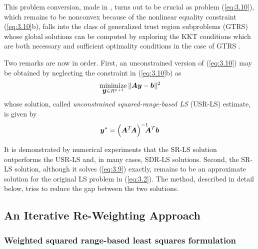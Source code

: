 This problem conversion, made in \cite{BeckStLi}, turns out to be crucial as problem (\ref{eq:3.10}), which remains to be nonconvex because of the nonlinear equality constraint (\ref{eq:3.10}b), falls into the class of generalized trust region subproblems (GTRS) \cite{More, FortinWol}  whose global solutions can be computed by exploring the KKT conditions which are both necessary and sufficient optimality conditions in the case of GTRS \cite{More}.

Two remarks are now in order. First, an unconstrained version of (\ref{eq:3.10}) may be obtained by neglecting the constraint in (\ref{eq:3.10}b) as
\begin{equation} \label{eq:3.13}%
\Min_{{\By} \in R^{n+1}} \|\BA\By-\Bb\|^2
\end{equation}
whose solution, called \textit{unconstrained squared-range-based LS }(USR-LS) estimate, is given by
\begin{equation} \label{eq:3.14}%
\By^*=\left(\BA^T\!\BA\right)^{-1}\!\!\!\!\BA^T\Bb
\end{equation}

It is demonstrated by numerical experiments \cite{BeckStLi} that the SR-LS solution outperforms the USR-LS and, in many cases, SDR-LS solutions. Second, the SR-LS solution, although it solves (\ref{eq:3.9}) exactly, remains to be an approximate solution for the original LS problem in (\ref{eq:3.2}). The method, described in detail below, tries to reduce the gap between the two solutions.

\subsection{An Iterative Re-Weighting Approach}%
\subsubsection{Weighted squared range-based least squares formulation} %

